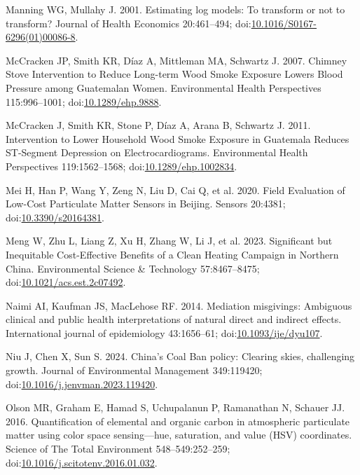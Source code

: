 \documentclass[
  letterpaper,
  DIV=11,
  numbers=noendperiod]{scrartcl}
\newlength{\cslhangindent}
\newenvironment{CSLReferences}[2] %
 {\begin{list}{}{%
  \setlength{\itemindent}{0pt}
  \setlength{\leftmargin}{0pt}
  \setlength{\parsep}{0pt}
  \ifodd #1
   \setlength{\leftmargin}{\cslhangindent}
   \setlength{\itemindent}{-1\cslhangindent}
  \fi
  \setlength{\itemsep}{#2\baselineskip}}}
 {\end{list}}
\begin{document}
\begin{CSLReferences}{1}{1}
Manning WG, Mullahy J. 2001. Estimating log models: To transform or not
to transform? Journal of Health Economics 20:461--494;
doi:\href{https://doi.org/10.1016/S0167-6296(01)00086-8}{10.1016/S0167-6296(01)00086-8}.

McCracken JP, Smith KR, Díaz A, Mittleman MA, Schwartz J. 2007. Chimney
{Stove Intervention} to {Reduce Long-term Wood Smoke Exposure Lowers
Blood Pressure} among {Guatemalan Women}. Environmental Health
Perspectives 115:996--1001;
doi:\href{https://doi.org/10.1289/ehp.9888}{10.1289/ehp.9888}.

McCracken J, Smith KR, Stone P, Díaz A, Arana B, Schwartz J. 2011.
Intervention to {Lower Household Wood Smoke Exposure} in {Guatemala
Reduces ST-Segment Depression} on {Electrocardiograms}. Environmental
Health Perspectives 119:1562--1568;
doi:\href{https://doi.org/10.1289/ehp.1002834}{10.1289/ehp.1002834}.

Mei H, Han P, Wang Y, Zeng N, Liu D, Cai Q, et al. 2020. Field
{Evaluation} of {Low-Cost Particulate Matter Sensors} in {Beijing}.
Sensors 20:4381;
doi:\href{https://doi.org/10.3390/s20164381}{10.3390/s20164381}.

Meng W, Zhu L, Liang Z, Xu H, Zhang W, Li J, et al. 2023. Significant
but {Inequitable Cost-Effective Benefits} of a {Clean Heating Campaign}
in {Northern China}. Environmental Science \& Technology 57:8467--8475;
doi:\href{https://doi.org/10.1021/acs.est.2c07492}{10.1021/acs.est.2c07492}.

Naimi AI, Kaufman JS, MacLehose RF. 2014. Mediation misgivings:
Ambiguous clinical and public health interpretations of natural direct
and indirect effects. International journal of epidemiology 43:1656--61;
doi:\href{https://doi.org/10.1093/ije/dyu107}{10.1093/ije/dyu107}.

Niu J, Chen X, Sun S. 2024. China's {Coal Ban} policy: {Clearing} skies,
challenging growth. Journal of Environmental Management 349:119420;
doi:\href{https://doi.org/10.1016/j.jenvman.2023.119420}{10.1016/j.jenvman.2023.119420}.

Olson MR, Graham E, Hamad S, Uchupalanun P, Ramanathan N, Schauer JJ.
2016. Quantification of elemental and organic carbon in atmospheric
particulate matter using color space sensing---hue, saturation, and
value ({HSV}) coordinates. Science of The Total Environment
548--549:252--259;
doi:\href{https://doi.org/10.1016/j.scitotenv.2016.01.032}{10.1016/j.scitotenv.2016.01.032}.


\end{CSLReferences}
\end{document}
